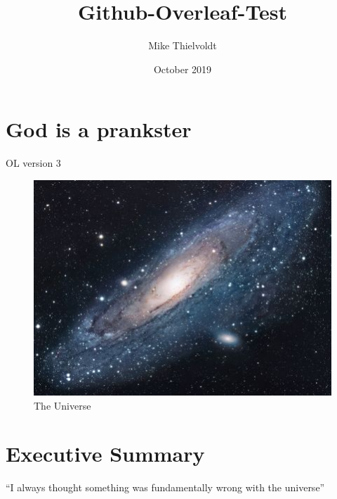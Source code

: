 \documentclass{article}
\title{Github-Overleaf-Test}
\author{Mike Thielvoldt}
\date{October 2019}
\begin{document}
\maketitle

\section{God is a prankster}
OL version 3

\begin{figure}[h!]
\centering
\includegraphics[scale=1.7]{universe}
\caption{The Universe}
\label{fig:universe}
\end{figure}


\section{Executive Summary}
``I always thought something was fundamentally wrong with the universe'' \citep{adams1995hitchhiker}



\end{document}
